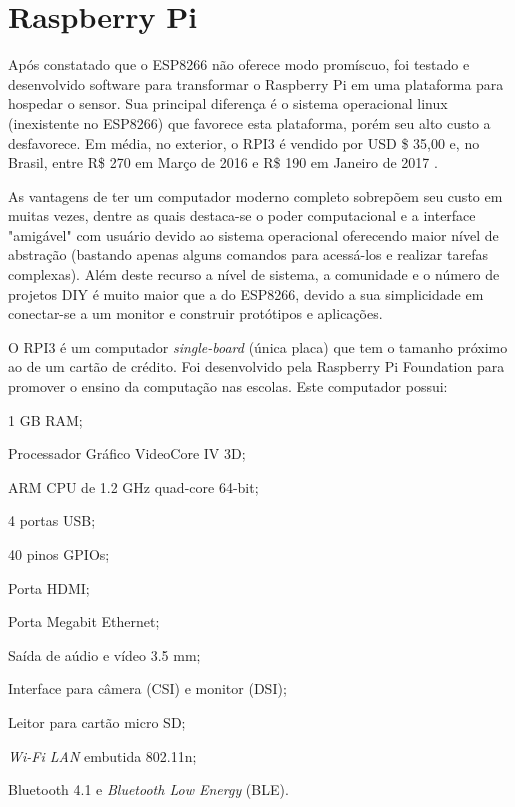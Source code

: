 
\section{Raspberry Pi}
\label{sec:Raspberry-Pi}

Após constatado que o ESP8266 não oferece modo promíscuo, foi testado e
desenvolvido software para transformar o Raspberry Pi em uma plataforma para
hospedar o sensor. Sua principal diferença é o sistema operacional linux
(inexistente no ESP8266) que favorece esta plataforma, porém seu alto custo a
desfavorece. Em média, no exterior, o RPI3 é vendido por USD \$ 35,00
\cite{RPI2016} e, no Brasil, entre R\$ 270 em Março de 2016 e R\$ 190 em Janeiro
de 2017 \cite{rpi3-mercadolivre}.

As vantagens de ter um computador moderno completo sobrepõem seu custo em muitas
vezes, dentre as quais destaca-se o poder computacional e a interface "amigável"
com usuário devido ao
sistema operacional oferecendo maior nível de abstração (bastando apenas alguns
comandos para acessá-los e realizar tarefas complexas).
Além deste recurso a nível de sistema, a comunidade e o número de projetos DIY
é muito maior que a do ESP8266, devido a sua simplicidade em
conectar-se a um monitor e construir protótipos e aplicações.

O RPI3 é um computador \emph{single-board}  (única
placa) que tem o tamanho próximo ao de um cartão de crédito. Foi desenvolvido
pela Raspberry Pi Foundation para promover o ensino da computação nas
escolas. Este computador possui:


\begin{alineas}
	\item 1 GB RAM;

	\item Processador Gráfico VideoCore IV 3D;

	\item ARM CPU de 1.2 GHz quad-core 64-bit;

	\item 4 portas USB;

	\item 40 pinos GPIOs;

	\item Porta HDMI;

	\item Porta Megabit Ethernet;

	\item Saída de aúdio e vídeo 3.5 mm;

	\item Interface para câmera (CSI) e monitor (DSI);

	\item Leitor para cartão micro SD;

	\item \emph{Wi-Fi LAN} embutida 802.11n;

	\item Bluetooth 4.1 e \emph{Bluetooth Low Energy} (BLE).

\end{alineas}

